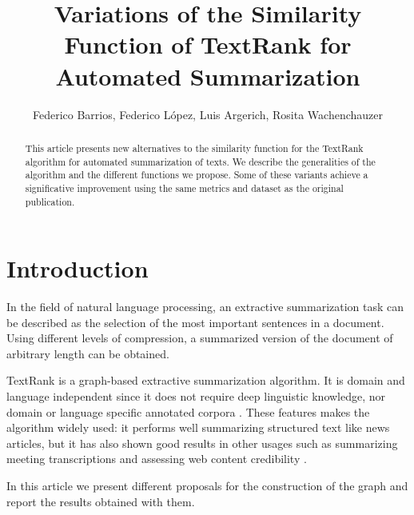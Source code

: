 \documentclass{llncs}
\begin{document}
\frontmatter

\title{Variations of the Similarity Function of TextRank for Automated Summarization}

\author{Federico Barrios, Federico López, Luis Argerich, Rosita Wachenchauzer}

\maketitle

\begin{abstract}
This article presents new alternatives to the similarity function for the TextRank algorithm for automated summarization of texts. We describe the generalities of the algorithm and the different functions we propose. Some of these variants achieve a significative improvement using the same metrics and dataset as the original publication. 

\end{abstract}

\section{Introduction}
In the field of natural language processing, an extractive summarization task can be described as the selection of the most important sentences in a document. Using different levels of compression, a summarized version of the document of arbitrary length can be obtained.

TextRank is a graph-based extractive summarization algorithm. It is domain and language independent since it does not require deep linguistic knowledge, nor domain or language specific annotated corpora \cite{mihalcea}. These features makes the algorithm widely used: it performs well summarizing structured text like news articles, but it has also shown good results in other usages such as summarizing meeting transcriptions \cite{garg} and assessing web content credibility \cite{balcerzak}.

In this article we present different proposals for the construction of the graph and report the results obtained with them.
\end{document}
